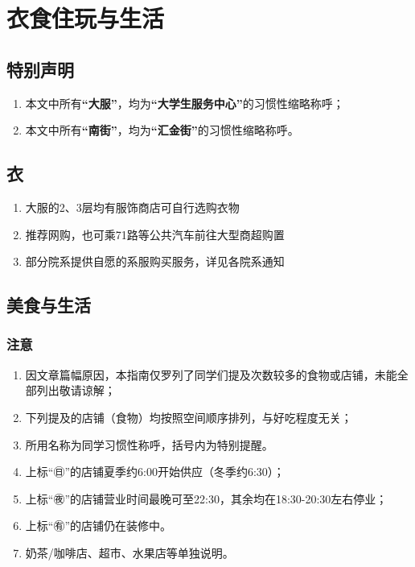 \chapter[衣食住玩与生活]{衣食住玩与生活}
\section*{特别声明}
\begin{enumerate}
    \item 本文中所有\textbf{“大服”}，均为\textbf{“大学生服务中心”}的习惯性缩略称呼；
    \item 本文中所有\textbf{“南街”}，均为\textbf{“汇金街”}的习惯性缩略称呼。
\end{enumerate}
\section[衣]{衣}
\begin{enumerate}
    \item 大服的2、3层均有服饰商店可自行选购衣物
    \item 推荐网购，也可乘71路等公共汽车前往大型商超购置
    \item 部分院系提供自愿的系服购买服务，详见各院系通知
\end{enumerate}

\section[美食与生活]{美食与生活}

\subsection*{注意}
\begin{enumerate}
    \item 因文章篇幅原因，本指南仅罗列了同学们提及次数较多的食物或店铺，未能全部列出敬请谅解；
    \item 下列提及的店铺（食物）均按照空间顺序排列，与好吃程度无关；
    \item 所用名称为同学习惯性称呼，括号内为特别提醒。
    \item 上标“㊐”的店铺夏季约6:00开始供应（冬季约6:30）；
    \item 上标“㊰”的店铺营业时间最晚可至22:30，其余均在18:30-20:30左右停业；
    \item 上标“㊒”的店铺仍在装修中。
    \item 奶茶/咖啡店、超市、水果店等单独说明。
\end{enumerate}

